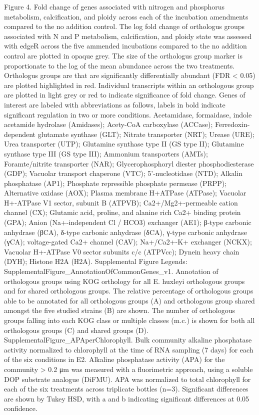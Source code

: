 Figure 4. Fold change of genes associated with nitrogen and phosphorus metabolism, calcification, and ploidy across each of the incubation amendments compared to the no addition control. The log fold change of orthologus groups associated with N and P metabolism, calcification, and ploidy state was assessed with edgeR across the five ammended incubations compared to the no addition control are plotted in opaque grey. The size of the orthologus group marker is proportionate to the log of the mean abundance across the two treatments. Orthologus groups are that are significantly differentially abundant (FDR < 0.05) are plotted highlighted in red. Individual transcripts within an orthologous group are plotted in light grey or red to indicate significance of fold change. Genes of interest are labeled with abbreviations as follows, labels in bold indicate significant regulation in two or more conditions. Acetamidase, formaidase, indole acetamide hydrolase (Amidases); Acety-CoA carboxylase (ACCase); Ferredoxin-dependent glutamate synthase (GLT); Nitrate transporter (NRT); Urease (URE); Urea transporter (UTP); Glutamine synthase type II (GS type II); Glutamine synthase type III (GS type III); Ammonium transporters (AMTs); Foramte/nitrite transporter (NAR); Glycerophosphoryl diester phosphodiesterase (GDP); Vacuolar transport chaperone (VTC); 5’-nucleotidase (NTD); Alkalin phosphatase (AP1); Phosphate repressible phosphate permease (PRPP); Alternative oxidase (AOX); Plasma membrane H+ATPase (ATPase); Vacuolar H+-ATPase V1 sector, subunit B (ATPVB); Ca2+/Mg2+-permeable cation channel (CX); Glutamic acid, proline, and alanine rich Ca2+ binding protein (GPA); Anion (Na+-independent Cl / HCO3) exchanger (AE1); β-type carbonic anhydrase (βCA), δ-type carbonic anhydrase (δCA), γ-type carbonic anhydrase (γCA); voltage-gated Ca2+ channel (CAV); Na+/Ca2+-K+ exchanger (NCKX); Vacuolar H+-ATPase V0 sector subunits c/c (ATPVcc); Dynein heavy chain (DYH); Histone H2A (H2A). 
Supplemental Figure Legends: 
SupplementalFigure\_AnnotationOfCommonGenes\_v1. Annotation of orthologous groups using KOG orthology for all E. huxleyi orthologous groups and for shared orthologous groups. The relative percentage of orthologous groups able to be annotated for all orthologous groups (A) and orthologous group shared amongst the five studied strains (B) are shown. The number of orthologous groups falling into each KOG class or multiple classes (m.c.) is shown for both all orthologous groups (C) and shared groups (D). 
SupplementalFigure\_APAperChlorophyll. Bulk community alkaline phosphatase activity normalized to chlorophyll at the time of RNA sampling (7 days) for each of the six conditions in E2. Alkaline phosphatase activity (APA) for the community > 0.2 μm was measured with a fluorimetric approach, using a soluble DOP substrate analogue (DiFMU).  APA was normalized to total chlorophyll for each of the six treatments across triplicate bottles (n=3). Significant differences are shown by Tukey HSD, with a and b indicating significant differences at 0.05 confidence. 
